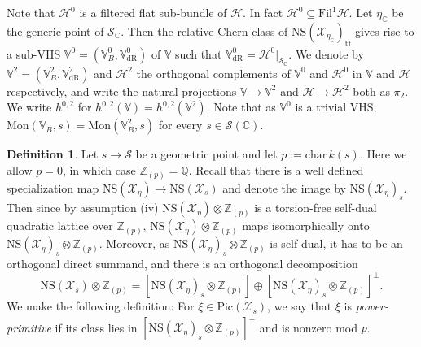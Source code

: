 \documentclass[letter, 11pt]{article}
\theoremstyle{plain}
\theoremstyle{definition}
\newtheorem{definition}[subsubsection]{Definition}
\newcommand{\IC}{\mathbb{C}}
\newcommand{\IQ}{\mathbb{Q}}
\newcommand{\IV}{\mathbb{V}}
\newcommand{\IZ}{\mathbb{Z}}
\newcommand\tensor{{\otimes}}
\newcommand{\<}{\langle}
\renewcommand{\>}{\rangle}
\def\wt{\widetilde}
\newcommand{\tf}{\wt{f}}
\newcommand{\sH}{\mathcal{H}}
\newcommand{\sX}{\mathcal{X}}
\newcommand{\sS}{\mathcal{S}}
\newcommand{\Pic}{\mathrm{Pic}}
\newcommand{\Fil}{\mathrm{Fil}}
\newcommand{\dR}{\mathrm{dR}}
\newcommand{\NS}{\mathrm{NS}}
\renewcommand{\tf}{\mathrm{tf}}
\newcommand{\Mon}{\mathrm{Mon}}
\begin{document}

Note that $\sH^0$ is a filtered flat sub-bundle of $\sH$. In fact $\sH^0 \subseteq \Fil^1 \sH$. Let $\eta_\IC$ be the generic point of $\sS_\IC$. Then the relative Chern class of $\NS(\sX_{\eta_\IC})_\tf$ gives rise to a sub-VHS $\IV^0 = (\IV^0_B, \IV^0_\dR)$ of $\IV$ such that $\IV^0_\dR = \sH^0|_{\sS_\IC}$. We denote by $\IV^2 = (\IV^2_B, \IV^2_\dR)$ and $\sH^2$ the orthogonal complements of $\IV^0$ and $\sH^0$ in $\IV$ and $\sH$ respectively, and write the natural projections $\IV \to \IV^2$ and $\sH \to \sH^2$ both as $\pi_2$. We write $h^{0, 2}$ for $h^{0, 2}(\IV) = h^{0, 2}(\IV^2)$. Note that as $\IV^0$ is a trivial VHS, $\Mon(\IV_B, s) = \Mon(\IV^2_B, s)$ for every $s \in \sS(\IC)$. 

\begin{definition}
\label{def: power-primitive} 
    Let $s \to \sS$ be a geometric point and let $p := \mathrm{char\,}k(s)$. Here we allow $p = 0$, in which case $\IZ_{(p)} = \IQ$. Recall that there is a well defined specialization map $\NS(\sX_\eta) \to \NS(\sX_s)$ and denote the image by $\NS(\sX_\eta)_s$. Then since by assumption (iv) 
    $\NS(\sX_{\eta}) \tensor \IZ_{(p)}$ is a torsion-free self-dual quadratic lattice over $\IZ_{(p)}$, $\NS(\sX_{\eta}) \tensor \IZ_{(p)}$ maps isomorphically onto $\NS(\sX_{\eta})_s \tensor \IZ_{(p)}$. Moreover, as $\NS(\sX_{\eta})_s \tensor \IZ_{(p)}$ is self-dual, it has to be an orthogonal direct summand, and there is an orthogonal decomposition 
    \begin{equation}
    \label{eqn: decomp over Zp}
        \NS(\sX_s) \tensor \IZ_{(p)} = [\NS(\sX_{\eta})_{s} \tensor \IZ_{(p)}] \oplus [\NS(\sX_{\eta})_{s} \tensor \IZ_{(p)}]^\perp.
    \end{equation} We make the following definition: For $\xi \in \Pic(\sX_s)$, we say that $\xi$ is \textit{power-primitive} if its class lies in $[\NS(\sX_{\eta})_{s} \tensor \IZ_{(p)}]^\perp$ and is nonzero mod $p$.
\end{definition}
\end{document}
